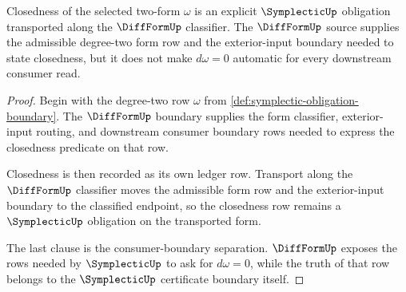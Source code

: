 \begin{theorem}
\label{thm:symplectic-closed-two-form-obligation}
Closedness of the selected two-form $\omega$ is an explicit $\SymplecticUp$ obligation transported along the $\DiffFormUp$ classifier. The $\DiffFormUp$ source supplies the admissible degree-two form row and the exterior-input boundary needed to state closedness, but it does not make $d\omega=0$ automatic for every downstream consumer read.
\end{theorem}
\begin{proof}
Begin with the degree-two row $\omega$ from \autoref{def:symplectic-obligation-boundary}. The $\DiffFormUp$ boundary supplies the form classifier, exterior-input routing, and downstream consumer boundary rows needed to express the closedness predicate on that row.

Closedness is then recorded as its own ledger row. Transport along the $\DiffFormUp$ classifier moves the admissible form row and the exterior-input boundary to the classified endpoint, so the closedness row remains a $\SymplecticUp$ obligation on the transported form.

The last clause is the consumer-boundary separation. $\DiffFormUp$ exposes the rows needed by $\SymplecticUp$ to ask for $d\omega=0$, while the truth of that row belongs to the $\SymplecticUp$ certificate boundary itself.
\end{proof}

